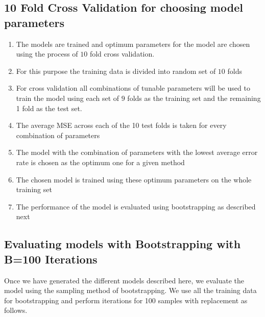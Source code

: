 \documentclass[twoside,12pt]{article}
\begin{document}
\subsection{10 Fold Cross Validation for choosing model parameters}
\begin{enumerate}
\item
The models are trained and optimum parameters for the model are chosen using the process of $10$ fold cross validation.
\item
For this purpose the training data is divided into random set of $10$ folds
\item
For cross validation all combinations of tunable parameters will be used to train the model using each set of $9$ folds as the training set and the remaining 1 fold as the test set.
\item
The average MSE across each of the 10 test folds is taken for every combination of parameters
\item
The model with the combination of parameters with the lowest average error rate is chosen as the optimum one for a given method
\item
The chosen model is trained using these optimum parameters on the whole training set
\item
The performance of the model is evaluated using bootstrapping as described next
\end{enumerate}


\subsection{Evaluating models with Bootstrapping with B=100 Iterations}

Once we have generated the different models described here, we evaluate the model using the sampling method of bootstrapping. We use all the training data for bootstrapping and perform iterations for 100 samples with replacement as follows.
\end{document}
